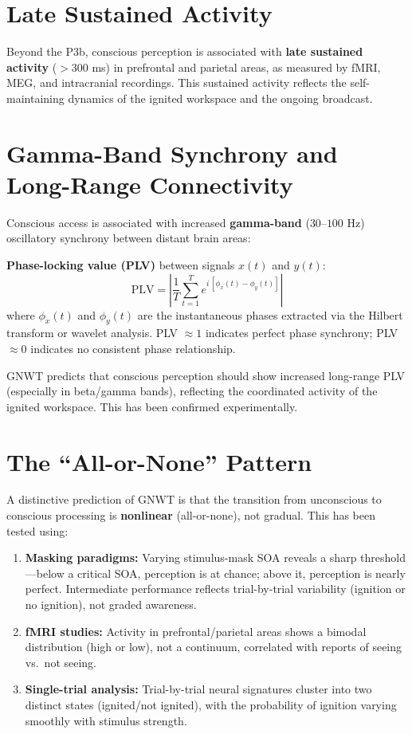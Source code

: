 \documentclass[11pt,a4paper]{report}
\begin{document}
\section{Late Sustained Activity}

Beyond the P3b, conscious perception is associated with \textbf{late sustained activity} ($>$300 ms) in prefrontal and parietal areas, as measured by fMRI, MEG, and intracranial recordings. This sustained activity reflects the self-maintaining dynamics of the ignited workspace and the ongoing broadcast.

\section{Gamma-Band Synchrony and Long-Range Connectivity}

Conscious access is associated with increased \textbf{gamma-band} ($30$--$100$ Hz) oscillatory synchrony between distant brain areas:

\begin{mathbox}
\vspace{-6pt}
\textbf{Phase-locking value (PLV)} between signals $x(t)$ and $y(t)$:
\[
  \text{PLV} = \left| \frac{1}{T} \sum_{t=1}^{T} e^{i\,[\phi_x(t) - \phi_y(t)]} \right|
\]
where $\phi_x(t)$ and $\phi_y(t)$ are the instantaneous phases extracted via the Hilbert transform or wavelet analysis. PLV $\approx 1$ indicates perfect phase synchrony; PLV $\approx 0$ indicates no consistent phase relationship.
\vspace{-4pt}
\end{mathbox}

GNWT predicts that conscious perception should show increased long-range PLV (especially in beta/gamma bands), reflecting the coordinated activity of the ignited workspace. This has been confirmed experimentally.

\section{The ``All-or-None'' Pattern}

A distinctive prediction of GNWT is that the transition from unconscious to conscious processing is \textbf{nonlinear} (all-or-none), not gradual. This has been tested using:

\begin{enumerate}[leftmargin=2em]
  \item \textbf{Masking paradigms:} Varying stimulus-mask SOA reveals a sharp threshold---below a critical SOA, perception is at chance; above it, perception is nearly perfect. Intermediate performance reflects trial-by-trial variability (ignition or no ignition), not graded awareness.
  \item \textbf{fMRI studies:} Activity in prefrontal/parietal areas shows a bimodal distribution (high or low), not a continuum, correlated with reports of seeing vs.\ not seeing.
  \item \textbf{Single-trial analysis:} Trial-by-trial neural signatures cluster into two distinct states (ignited/not ignited), with the probability of ignition varying smoothly with stimulus strength.
\end{enumerate}
\end{document}
